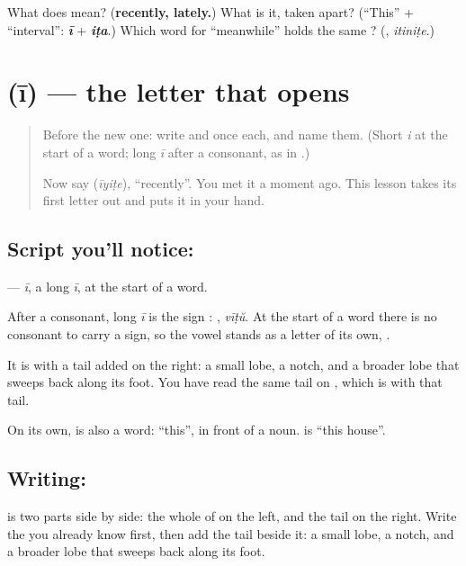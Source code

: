 \begin{tcolorbox}[breakable,colback=teal!4,colframe=teal!35!black,title={Before you move on}]
What does \textbf{} mean? (\textbf{recently, lately.}) What is it, taken apart? (\textquotedblleft{}This\textquotedblright{} + \textquotedblleft{}interval\textquotedblright{}: \emph{\textbf{ī}} + \emph{\textbf{iṭa}}.) Which word for \textquotedblleft{}meanwhile\textquotedblright{} holds the same \textbf{}? (\textbf{}, \emph{itiniṭe}.)
\end{tcolorbox}
\section[\texorpdfstring{\ml{ഈ} (ī)}{ഈ (ī)}]{ (ī) — the letter that opens }

\label{lesson:ML-W340-ii}



\begin{quote}
Before the new one: write \textbf{} and \textbf{} once each, and name them. (Short \emph{i} at the start of a word; long \emph{ī} after a consonant, as in \textbf{}.)

Now say \textbf{} (\emph{īyiṭe}), \textquotedblleft{}recently\textquotedblright{}. You met it a moment ago. This lesson takes its first letter out and puts it in your hand.
\end{quote}

\subsection*{Script you'll notice: }
\textbf{} — \emph{ī}, a long \emph{ī}, at the start of a word.

After a consonant, long \emph{ī} is the sign \textbf{}: \textbf{}, \emph{vīṭŭ}. At the start of a word there is no consonant to carry a sign, so the vowel stands as a letter of its own, \textbf{}.

It is \textbf{} with a tail added on the right: a small lobe, a notch, and a broader lobe that sweeps back along its foot. You have read the same tail on \textbf{}, which is \textbf{} with that tail.

On its own, \textbf{} is also a word: \textquotedblleft{}this\textquotedblright{}, in front of a noun. \textbf{ } is \textquotedblleft{}this house\textquotedblright{}.

\subsection*{Writing: }
\textbf{} is two parts side by side: the whole of \textbf{} on the left, and the tail on the right. Write the \textbf{} you already know first, then add the tail beside it: a small lobe, a notch, and a broader lobe that sweeps back along its foot.

